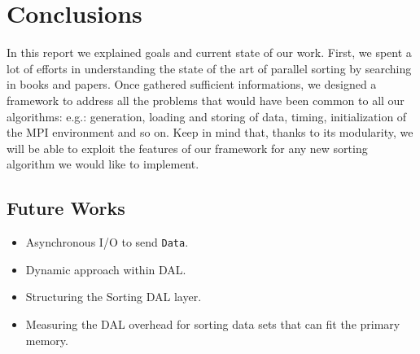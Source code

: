 \label{conclusion}
\section{Conclusions}
In this report we explained goals and current state of our work. First, we spent a lot of efforts in understanding the state of the art of parallel sorting by searching in books and papers. Once gathered sufficient informations, we designed a framework to address all the problems that would have been common to all our algorithms: e.g.: generation, loading and storing of data, timing, initialization of the MPI environment and so on. Keep in mind that, thanks to its modularity, we will be able to exploit the features of our framework for any new sorting algorithm we would like to implement. 

\subsection{Future Works}
\begin{itemize}
\item Asynchronous I/O to send \texttt{Data}. 
\item Dynamic approach within DAL.
\item Structuring the Sorting DAL layer.
\item Measuring the DAL overhead for sorting data sets that can fit the primary memory.
\end{itemize}